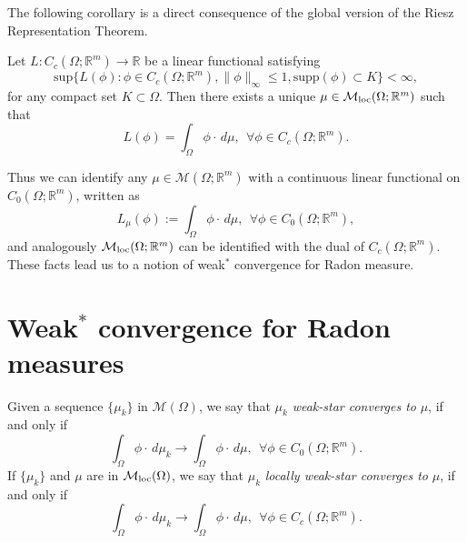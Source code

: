 The following corollary is a direct consequence of the global version of the Riesz Representation Theorem.

\begin{corollary} \label{Rieszrepr} Let $L: C_{c} (\Omega; \mathbb{R}^{m}) \to \mathbb{R}$ be a linear functional satisfying
\[ \mathrm{sup} \{ L(\phi) : \phi \in C_{c} (\Omega; \mathbb{R}^{m}), \|\phi\|_{\infty} \le 1, \mathrm{supp}(\phi) \subset K \} < \infty, \]
for any compact set $K \subset \Omega$.
Then there exists a unique $\mu \in \mathcal{M}_{\rm loc}(\Omega; \mathbb{R}^{m})$ such that
\[ L(\phi) = \int_{\Omega} \phi \cdot \, d\mu, \  \ \forall \phi \in C_{c}(\Omega; \mathbb{R}^{m}).  \]
\end{corollary}

Thus we can identify any $\mu \in \mathcal{M}(\Omega; \mathbb{R}^{m})$ with a continuous linear functional on $C_{0}(\Omega; \mathbb{R}^{m})$, written as
\[ L_{\mu}(\phi) := \int_{\Omega} \phi \cdot \, d\mu, \      \     \forall \phi \in C_{0}(\Omega; \mathbb{R}^{m}),   \]
and analogously $\mathcal{M}_{\rm loc}(\Omega; \mathbb{R}^{m})$ can be identified with the dual of $C_{c}(\Omega; \mathbb{R}^{m})$. These facts lead us to a notion of weak$^{*}$ convergence for Radon measure.

\section{Weak$^{*}$ convergence for Radon measures}

\begin{definition} Given a sequence $\{\mu_{k}\}$ in $\mathcal{M}(\Omega)$, we say that $\mu_{k}$ {\em weak-star converges to} $\mu$, if and only if
\[ \int_{\Omega} \phi \cdot \, d\mu_{k} \to \int_{\Omega} \phi \cdot \, d\mu, \    \   \forall \phi \in C_{0}(\Omega; \mathbb{R}^{m}).   \]
If $\{\mu_{k}\}$ and $\mu$ are in $\mathcal{M}_{\rm loc}(\Omega)$, we say that $\mu_{k}$ {\em locally weak-star converges to} $\mu$, if and only if
\[ \int_{\Omega} \phi \cdot \, d\mu_{k} \to \int_{\Omega} \phi \cdot \, d\mu, \    \   \forall \phi \in C_{c}(\Omega; \mathbb{R}^{m}).   \]
\end{definition}

